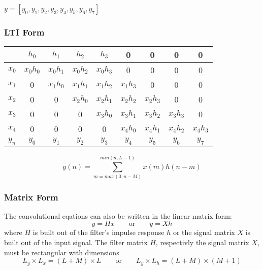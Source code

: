 $y=[y_0, y_1, y_2, y_3, y_4, y_5, y_6, y_7]$


\subsubsection{LTI Form}
\begin{tabular}{c|cccccccc|}
	& $h_0$ & $h_1$ & $h_2$ & $h_3$ & 0 & 0 & 0 & 0 \\
	\hline
	$x_0$ & $x_0h_0$ & $x_0h_1$ & $x_0h_2$ & $x_0h_3$ & 0 & 0 & 0 & 0 \\
	$x_1$ & 0 & $x_1h_0$ & $x_1h_1$ & $x_1h_2$ & $x_1h_3$ & 0 & 0 & 0 \\
	$x_2$ & 0 & 0 & $x_2h_0$ & $x_2h_1$ & $x_2h_2$ & $x_2h_3$ & 0 & 0 \\
	$x_3$ & 0 & 0 & 0 & $x_3h_0$ & $x_3h_1$ & $x_3h_2$ & $x_3h_3$ & 0 \\
	$x_4$ & 0 & 0 & 0 & 0 & $x_4h_0$ & $x_4h_1$ & $x_4h_2$ & $x_4h_3$ \\
	\hline
	$y_n$ & $y_0$ & $y_1$ & $y_2$ & $y_3$ & $y_4$ & $y_5$ & $y_6$ & $y_7$ \\
\end{tabular}
\[
	y(n) = \sum\limits_{m=max(0,n-M)}^{min(n,L-1)} x(m)h(n-m)
\]


\subsubsection{Matrix Form}
The convolutional eqations can also be written in the linear matrix form:
\[
	y = H  x	\qquad \text{or} \qquad y = Xh
\]
where $H$ is built out of the filter's impulse response $h$ or the signal matrix $X$ is built out of the input signal. 
The filter matrix $H$, respectivly the signal matrix $X$, must be rectangular with dimensions
\[
	L_y \times L_x = (L + M)\times L \qquad \text{or} \qquad
	L_y \times L_h = (L + M)\times (M + 1)
\]

